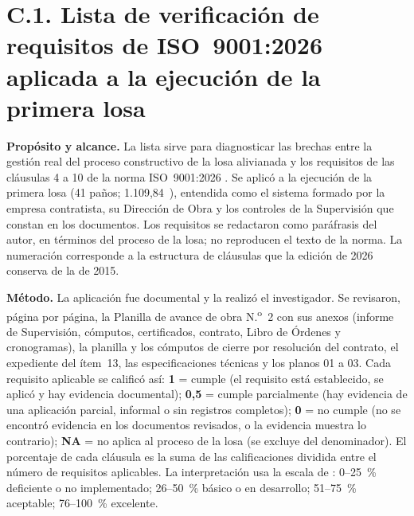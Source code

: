 \section*{C.1. Lista de verificación de requisitos de ISO~9001:2026 aplicada a la ejecución de la primera losa}
\label{anx:lista-iso}

\textbf{Propósito y alcance.} La lista sirve para diagnosticar las brechas entre la gestión real del proceso constructivo de la losa alivianada y los requisitos de las cláusulas 4 a 10 de la norma ISO~9001:2026 \parencite{iso9001_2026}. Se aplicó a la ejecución de la primera losa (41 paños; 1.109,84~\mdos{}), entendida como el sistema formado por la empresa contratista, su Dirección de Obra y los controles de la Supervisión que constan en los documentos. Los requisitos se redactaron como paráfrasis del autor, en términos del proceso de la losa; no reproducen el texto de la norma. La numeración corresponde a la estructura de cláusulas que la edición de 2026 conserva de la de 2015. 

\textbf{Método.} La aplicación fue documental y la realizó el investigador. Se revisaron, página por página, la Planilla de avance de obra N.\textsuperscript{o}~2 con sus anexos (informe de Supervisión, cómputos, certificados, contrato, Libro de Órdenes y cronogramas), la planilla y los cómputos de cierre por resolución del contrato, el expediente del ítem~13, las especificaciones técnicas y los planos 01 a 03. Cada requisito aplicable se calificó así: \textbf{1} = cumple (el requisito está establecido, se aplicó y hay evidencia documental); \textbf{0,5} = cumple parcialmente (hay evidencia de una aplicación parcial, informal o sin registros completos); \textbf{0} = no cumple (no se encontró evidencia en los documentos revisados, o la evidencia muestra lo contrario); \textbf{NA} = no aplica al proceso de la losa (se excluye del denominador). El porcentaje de cada cláusula es la suma de las calificaciones dividida entre el número de requisitos aplicables. La interpretación usa la escala de \textcite[p.~42]{mamanicalsina2025}: 0--25~\% deficiente o no implementado; 26--50~\% básico o en desarrollo; 51--75~\% aceptable; 76--100~\% excelente.


